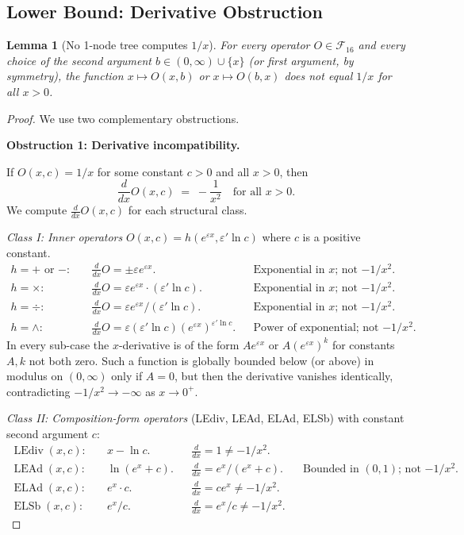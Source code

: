 \documentclass[12pt,a4paper]{article}
\newtheorem{lemma}[theorem]{Lemma}
\theoremstyle{definition}
\newcommand{\ELAd}{\operatorname{ELAd}}
\newcommand{\ELSb}{\operatorname{ELSb}}
\newcommand{\LEAd}{\operatorname{LEAd}}
\newcommand{\LEdiv}{\operatorname{LEdiv}}
\newcommand{\F}{\mathcal{F}_{16}}
\begin{document}
\subsection{Lower Bound: Derivative Obstruction}

\begin{lemma}[No 1-node tree computes $1/x$]\label{lem:recip-lower}
For every operator $O \in \F$ and every choice of the second argument
$b \in (0,\infty) \cup \{x\}$ (or first argument, by symmetry), the function
$x \mapsto O(x, b)$ or $x \mapsto O(b, x)$ does not equal $1/x$
for all $x > 0$.
\end{lemma}

\begin{proof}
We use two complementary obstructions.

\medskip
\noindent\textbf{Obstruction 1: Derivative incompatibility.}

If $O(x, c) = 1/x$ for some constant $c>0$ and all $x>0$, then
\begin{equation}
  \frac{d}{dx} O(x,c) \;=\; -\frac{1}{x^2} \quad \text{for all } x>0.
  \label{eq:recip-deriv}
\end{equation}
We compute $\frac{d}{dx}O(x,c)$ for each structural class.

\emph{Class I: Inner operators} $O(x,c) = h(e^{\varepsilon x}, \varepsilon'\ln c)$
where $c$ is a positive constant.
\begin{align*}
  h=+\text{ or }-: & \quad \tfrac{d}{dx}O = \pm\varepsilon e^{\varepsilon x}.
  && \text{Exponential in $x$; not $-1/x^2$.}\\
  h=\times: & \quad \tfrac{d}{dx}O = \varepsilon e^{\varepsilon x}\cdot(\varepsilon'\ln c).
  && \text{Exponential in $x$; not $-1/x^2$.}\\
  h=\div: & \quad \tfrac{d}{dx}O = \varepsilon e^{\varepsilon x}/(\varepsilon'\ln c).
  && \text{Exponential in $x$; not $-1/x^2$.}\\
  h=\wedge: & \quad \tfrac{d}{dx}O = \varepsilon(\varepsilon'\ln c)(e^{\varepsilon x})^{\varepsilon'\ln c}.
  && \text{Power of exponential; not $-1/x^2$.}
\end{align*}
In every sub-case the $x$-derivative is of the form $A e^{\varepsilon x}$ or
$A (e^{\varepsilon x})^k$ for constants $A, k$ not both zero.
Such a function is globally bounded below (or above) in modulus on $(0,\infty)$
only if $A=0$, but then the derivative vanishes identically, contradicting
$-1/x^2 \to -\infty$ as $x\to 0^+$.

\emph{Class II: Composition-form operators} (LEdiv, LEAd, ELAd, ELSb) with
constant second argument $c$:
\begin{align*}
  \LEdiv(x,c): & \quad x - \ln c. && \tfrac{d}{dx} = 1 \neq -1/x^2.\\
  \LEAd(x,c): & \quad \ln(e^x+c). && \tfrac{d}{dx} = e^x/(e^x+c). && \text{Bounded in $(0,1)$; not $-1/x^2$.}\\
  \ELAd(x,c): & \quad e^x\cdot c. && \tfrac{d}{dx} = ce^x \neq -1/x^2.\\
  \ELSb(x,c): & \quad e^x/c. && \tfrac{d}{dx} = e^x/c \neq -1/x^2.
\end{align*}


\end{proof}
\end{document}
